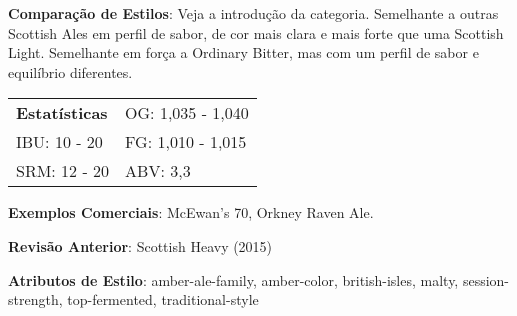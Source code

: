\textbf{Comparação de Estilos}: Veja a introdução da categoria. Semelhante a outras Scottish Ales em perfil de sabor, de cor mais clara e mais forte que uma Scottish Light. Semelhante em força a Ordinary Bitter, mas com um perfil de sabor e equilíbrio diferentes.

\begin{tabular}{@{}p{35mm}p{35mm}@{}}
  \textbf{Estatísticas} & OG: 1,035 - 1,040 \\
  IBU: 10 - 20 & FG: 1,010 - 1,015  \\
  SRM: 12 - 20  & ABV: 3,3%
\end{tabular}

\textbf{Exemplos Comerciais}: McEwan's 70, Orkney Raven Ale.

\textbf{Revisão Anterior}: Scottish Heavy (2015)

\textbf{Atributos de Estilo}: amber-ale-family, amber-color, british-isles, malty, session-strength, top-fermented, traditional-style
